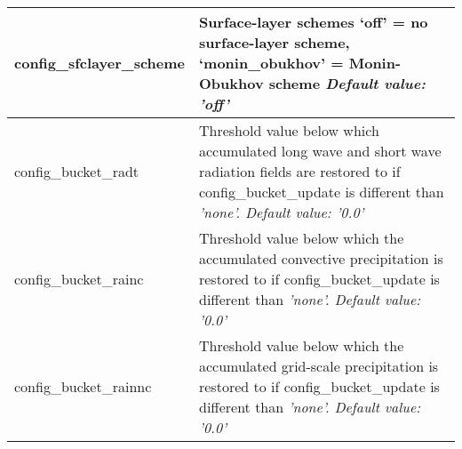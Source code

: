 {\begin{longtable}{|p{2.0in} |p{4.25in}|}
  config\_sfclayer\_scheme &  Surface-layer schemes \newline
                                             `off' = no surface-layer scheme, \newline
                                             `monin\_obukhov' = Monin-Obukhov scheme \newline                                              
  {\em Default value: 'off'} \\ \hline
 
  config\_bucket\_radt &  Threshold value below which accumulated long wave and short wave radiation fields are restored to if config\_bucket\_update is different than \em 'none'. \newline
  {\em Default value: '0.0'} \\ \hline
  
  config\_bucket\_rainc &  Threshold value below which the accumulated convective precipitation is restored to if config\_bucket\_update is different than \em 'none'.\newline
  {\em Default value: '0.0'} \\ \hline
  
  config\_bucket\_rainnc &  Threshold value below which the accumulated grid-scale precipitation is restored to if config\_bucket\_update is different than \em 'none'. \newline
  {\em Default value: '0.0'} \\ \hline
  
\end{longtable}
}


